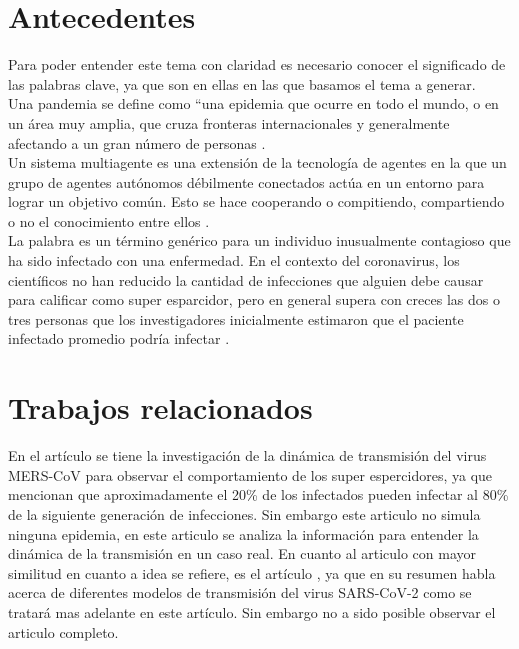 \documentclass[final,6p,times,twocolumn]{elsarticle}
\begin{document}
\section{Antecedentes}

Para poder entender este tema con claridad es necesario conocer el significado de las palabras clave, ya que son en ellas en las que basamos  el tema a generar.\\

Una pandemia se define como “una epidemia que ocurre en todo el mundo, o en un área muy amplia, que cruza fronteras internacionales y generalmente afectando a un gran número de personas \cite{Doshi} .\\

Un sistema multiagente es una extensión de la tecnología de agentes en la que un grupo de agentes autónomos débilmente conectados actúa en un entorno para lograr un objetivo común. Esto se hace cooperando o compitiendo, compartiendo o no el conocimiento entre ellos \cite{MuAg}.\\

La palabra es un término genérico para un individuo inusualmente contagioso que ha sido infectado con una enfermedad. En el contexto del coronavirus, los científicos no han reducido la cantidad de infecciones que alguien debe causar para calificar como super esparcidor, pero en general supera con creces las dos o tres personas que los investigadores inicialmente estimaron que el paciente infectado promedio podría infectar \cite{SS}.







\section{Trabajos relacionados}

En el artículo \cite{Korea} se tiene la investigación de la dinámica de transmisión del virus MERS-CoV para observar el comportamiento de los super espercidores, ya que mencionan que aproximadamente el 20\% de los infectados pueden infectar al 80\% de la siguiente generación de infecciones. Sin embargo este articulo no simula ninguna epidemia, en este articulo se analiza la información para entender la dinámica de la transmisión en un caso real. En cuanto al articulo con mayor similitud en cuanto a idea se refiere, es el artículo \cite{Malkov}, ya que en su resumen habla acerca de diferentes modelos de transmisión del virus SARS-CoV-2 como se tratará mas adelante en este artículo. Sin embargo no a sido posible observar el articulo completo.
 
\end{document}
